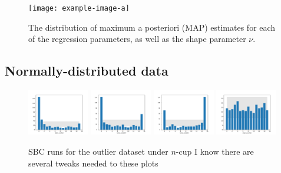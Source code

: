 \documentclass[fleqn,usenatbib]{mnras}
\begin{document}
\begin{figure}
    \texttt{[image: example-image-a]}
    \caption{The distribution of maximum a posteriori (MAP) estimates for each
    of the regression parameters, as well as the shape parameter $\nu$.}
    \label{fig:results.t.map}
\end{figure}

\subsection{Normally-distributed data}
\label{sec:results.outlier}

\begin{figure}
    \includegraphics[width=0.24\textwidth]{graphics/sbc_outlier_ncup/alpha_scaled.pdf}
    \includegraphics[width=0.24\textwidth]{graphics/sbc_outlier_ncup/beta_scaled.0.pdf}
    \includegraphics[width=0.24\textwidth]{graphics/sbc_outlier_ncup/beta_scaled.1.pdf}
    \includegraphics[width=0.24\textwidth]{graphics/sbc_outlier_ncup/sigma_scaled.pdf}
    \caption{SBC runs for the outlier dataset under $n$-cup {\color{red} I know
    there are several tweaks needed to these plots}}
    \label{fig:results.t.sbc}
\end{figure}
\end{document}
